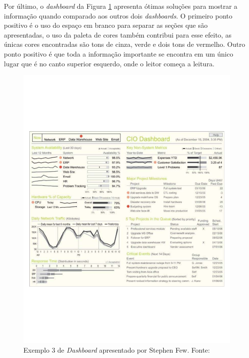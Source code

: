 Por último, o \textit{dashboard} da Figura \ref{img:dashboard3} apresenta ótimas soluções para mostrar a informação quando comparado aos outros dois \textit{dashboards}. O primeiro ponto positivo é o uso do espaço em branco para separar as seções que são apresentadas, o uso da paleta de cores também contribui para esse efeito, as únicas cores encontradas são tons de cinza, verde e dois tons de vermelho. Outro ponto positivo é que toda a informação importante se encontra em um único lugar que é no canto superior esquerdo, onde o leitor começa a leitura.
\graphicspath{{figuras/}}
\begin{figure}[H]
\centering
\includegraphics[scale=0.50]{dashboard3}
\caption{Exemplo 3 de \textit{Dashboard} apresentado por Stephen Few. Fonte: \cite{book_design}}
\label{img:dashboard3}
\end{figure}

